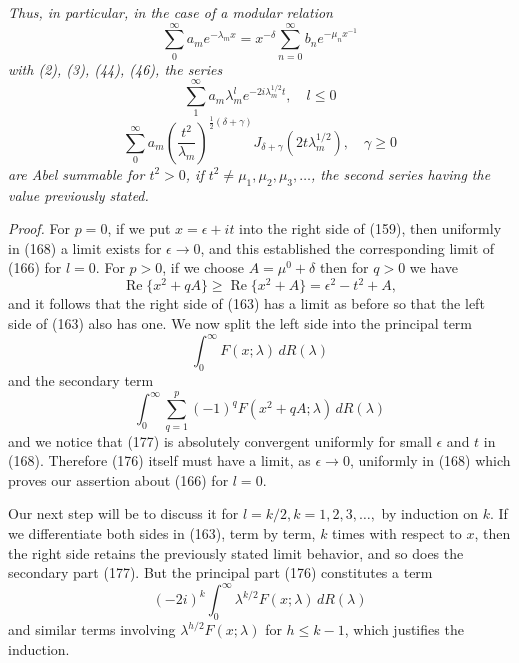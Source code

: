 \documentclass[12pt]{article}
\begin{document}
\emph{Thus, in particular, in the case of a modular relation}
\begin{equation}
\sum_0^{\infty} a_m e^{-\lambda_m x} = x^{-\delta} \sum_{n=0}^{\infty} b_n e^{-\mu_n x^{-1}}
\tag{172}
\end{equation}
\emph{with (2), (3), (44), (46), the series}
\begin{equation}
\sum_1^{\infty} a_m \lambda_m^l e^{-2i\lambda_m^{1/2}t}, \quad l \le 0
\tag{173}
\end{equation}
\begin{equation}
\sum_0^{\infty} a_m \left( \frac{t^2}{\lambda_m} \right)^{\frac{1}{2}(\delta+\gamma)} J_{\delta+\gamma}(2t\lambda_m^{1/2}), \quad \gamma \ge 0
\tag{174}
\end{equation}
\emph{are Abel summable for \(t^2 > 0\), if \(t^2 \ne \mu_1, \mu_2, \mu_3, \dots\), the second series having the value previously stated.}

\medskip

\noindent\emph{Proof.} For \(p = 0\), if we put \(x = \epsilon + it\) into the right side of (159), then uniformly in (168) a limit exists for \(\epsilon \to 0\), and this established the corresponding limit of (166) for \(l = 0\). For \(p > 0\), if we choose \(A = \mu^0 + \delta\) then for \(q > 0\) we have
\begin{equation}
\operatorname{Re}\{x^2 + qA\} \ge \operatorname{Re}\{x^2 + A\} = \epsilon^2 - t^2 + A,
\tag{175}
\end{equation}
and it follows that the right side of (163) has a limit as before so that the left side of (163) also has one. We now split the left side into the principal term
\begin{equation}
\int_0^{\infty} F(x; \lambda) \, dR(\lambda)
\tag{176}
\end{equation}
and the secondary term
\begin{equation}
\int_0^{\infty} \sum_{q=1}^p (-1)^q F(x^2 + qA; \lambda) \, dR(\lambda)
\tag{177}
\end{equation}
and we notice that (177) is absolutely convergent uniformly for small \(\epsilon\) and \(t\) in (168). Therefore (176) itself must have a limit, as \(\epsilon \to 0\), uniformly in (168) which proves our assertion about (166) for \(l = 0\).

Our next step will be to discuss it for \(l = k/2, k = 1, 2, 3, \dots,\) by induction on \(k\). If we differentiate both sides in (163), term by term, \(k\) times with respect to \(x\), then the right side retains the previously stated limit behavior, and so does the secondary part (177). But the principal part (176) constitutes a term
\begin{equation}
(-2i)^k \int_0^{\infty} \lambda^{k/2} F(x; \lambda) \, dR(\lambda)
\tag{178}
\end{equation}
and similar terms involving \(\lambda^{h/2} F(x; \lambda)\) for \(h \le k - 1\), which justifies the induction.
\end{document}
